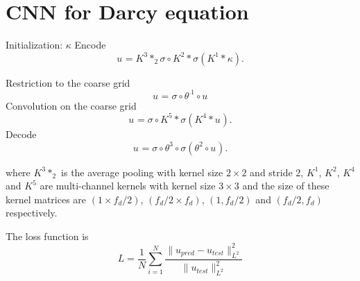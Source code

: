 \newpage
\section{CNN for Darcy equation}
\begin{breakablealgorithm}
	\caption{$u={\rm DarcyCNN}(\kappa; f_d, coarse\_grid\_size,)$}
	\label{alg:mgnet}
	\begin{algorithmic}
		\State Initialization:  $\kappa$
		\State Encode
		\begin{equation}
		u^{} = K^{3}  \ast_2 \sigma \circ K^{ 2}\ast \sigma (K^{ 1}\ast \kappa).
		\end{equation}
	
		\State Restriction to the coarse grid
		\begin{equation}
		u^{} = \sigma \circ \theta^{. 1} \circ u^{}
		\end{equation}
		\State
		Convolution on the coarse grid
		\begin{equation}
		u^{} =  \sigma \circ K^{ 5}\ast \sigma (K^{ 4}\ast u^{}).
		\end{equation}
		\State Decode
		\begin{equation}
		u^{} =  \sigma \circ \theta^{ 3}\circ \sigma (\theta^{ 2}\circ u^{}).
		\end{equation}
	\end{algorithmic}
\end{breakablealgorithm}

	where $K^{3}  \ast_2$ is the average pooling with kernel size $2  \times 2$ and stride 2, $K^{1}$, $K^{2} $, $K^{4} $ and $K^{5}  $ are multi-channel kernels with kernel size $3  \times 3$ and the size of these kernel matrices are $(1 \times f_d/2)$, $ (f_d/2 \times f_d)$, $(1,f_d/2)$ and $(f_d/2, f_d)$ respectively.
	
The loss function is 
$$
L = \frac{1}{N} \sum_{i=1}^{N} \frac{\| u_{pred} - u_{test}\|_{L^2}^2}{\| u_{test}\|_{L^2}^2}
$$

